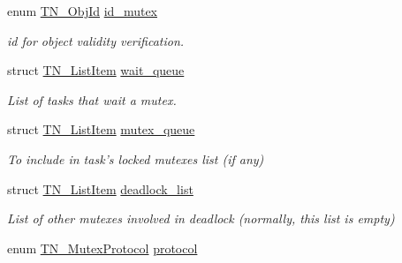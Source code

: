 \begin{DoxyCompactItemize}
\item 
enum \hyperlink{tn__common_8h_ae779dd1f6735f6e139fb70acd004d976}{T\+N\+\_\+\+Obj\+Id} \hyperlink{structTN__Mutex_a09b2fb7b45cab984dd3db1c9d1d3b5b4}{id\+\_\+mutex}
\begin{DoxyCompactList}\small\item\em id for object validity verification. \end{DoxyCompactList}\item 
\hypertarget{structTN__Mutex_a65bc07cade239063ba47a140a7d46a92}{struct \hyperlink{structTN__ListItem}{T\+N\+\_\+\+List\+Item} \hyperlink{structTN__Mutex_a65bc07cade239063ba47a140a7d46a92}{wait\+\_\+queue}}\label{structTN__Mutex_a65bc07cade239063ba47a140a7d46a92}

\begin{DoxyCompactList}\small\item\em List of tasks that wait a mutex. \end{DoxyCompactList}\item 
\hypertarget{structTN__Mutex_a3d9a36e9441d047a4ec04878cf4ca2fd}{struct \hyperlink{structTN__ListItem}{T\+N\+\_\+\+List\+Item} \hyperlink{structTN__Mutex_a3d9a36e9441d047a4ec04878cf4ca2fd}{mutex\+\_\+queue}}\label{structTN__Mutex_a3d9a36e9441d047a4ec04878cf4ca2fd}

\begin{DoxyCompactList}\small\item\em To include in task's locked mutexes list (if any) \end{DoxyCompactList}\item 
\hypertarget{structTN__Mutex_afd61f3a49d4c2538a6784e2202893e47}{struct \hyperlink{structTN__ListItem}{T\+N\+\_\+\+List\+Item} \hyperlink{structTN__Mutex_afd61f3a49d4c2538a6784e2202893e47}{deadlock\+\_\+list}}\label{structTN__Mutex_afd61f3a49d4c2538a6784e2202893e47}

\begin{DoxyCompactList}\small\item\em List of other mutexes involved in deadlock (normally, this list is empty) \end{DoxyCompactList}\item 
\hypertarget{structTN__Mutex_a94cb6bc95a05bfd95c0a088c56712bab}{enum \hyperlink{tn__mutex_8h_a11357f7bb31a3b380cbe94e0913a5b40}{T\+N\+\_\+\+Mutex\+Protocol} \hyperlink{structTN__Mutex_a94cb6bc95a05bfd95c0a088c56712bab}{protocol}}\label{structTN__Mutex_a94cb6bc95a05bfd95c0a088c56712bab}


\end{DoxyCompactItemize}
